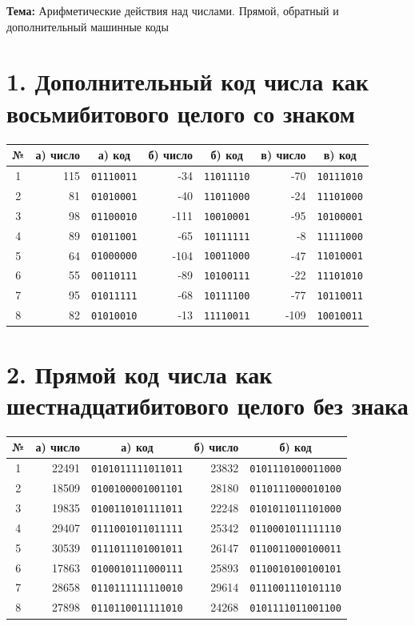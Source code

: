 \documentclass[a4paper,12pt]{article}
\newcommand{\bin}[1]{\texttt{#1}}
\begin{document}
\noindent\textbf{Тема:} Арифметические действия над числами. Прямой,
обратный и дополнительный машинные коды\

\section*{1. Дополнительный код числа как восьмибитового целого со знаком}

\begin{center}
  \begin{tabular}{c|r|c|r|c|r|c}
    \toprule
№ & а) число & а) код & б) число & б) код & в) число & в) код \\
\midrule
1 & 115 & \bin{01110011} & -34  & \bin{11011110} & -70  & \bin{10111010} \\
2 & 81  & \bin{01010001} & -40  & \bin{11011000} & -24  & \bin{11101000} \\
3 & 98  & \bin{01100010} & -111 & \bin{10010001} & -95  & \bin{10100001} \\
4 & 89  & \bin{01011001} & -65  & \bin{10111111} & -8   & \bin{11111000} \\
5 & 64  & \bin{01000000} & -104 & \bin{10011000} & -47  & \bin{11010001} \\
6 & 55  & \bin{00110111} & -89  & \bin{10100111} & -22  & \bin{11101010} \\
7 & 95  & \bin{01011111} & -68  & \bin{10111100} & -77  & \bin{10110011} \\
8 & 82  & \bin{01010010} & -13  & \bin{11110011} & -109 & \bin{10010011} \\
\bottomrule
\end{tabular}
\end{center}

\section*{2. Прямой код числа как шестнадцатибитового целого без знака}

\begin{center}
\begin{tabular}{c|r|c|r|c}
\toprule
№ & а) число & а) код & б) число & б) код \\
\midrule
1 & 22491 & \bin{0101011111011011} & 23832 & \bin{0101110100011000} \\
2 & 18509 & \bin{0100100001001101} & 28180 & \bin{0110111000010100} \\
3 & 19835 & \bin{0100110101111011} & 22248 & \bin{0101011011101000} \\
4 & 29407 & \bin{0111001011011111} & 25342 & \bin{0110001011111110} \\
5 & 30539 & \bin{0111011101001011} & 26147 & \bin{0110011000100011} \\
6 & 17863 & \bin{0100010111000111} & 25893 & \bin{0110010100100101} \\
7 & 28658 & \bin{0110111111110010} & 29614 & \bin{0111001110101110} \\
8 & 27898 & \bin{0110110011111010} & 24268 & \bin{0101111011001100} \\
\bottomrule
\end{tabular}
\end{center}
\end{document}
